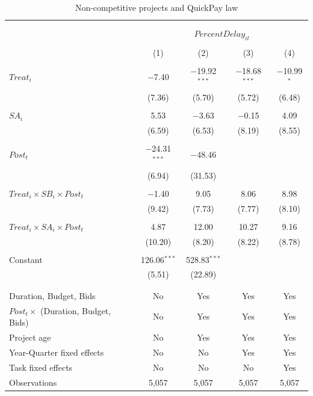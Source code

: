 \documentclass[
]{article}
\begin{document}
\begin{table}[H] \centering 
  \caption{Non-competitive projects and QuickPay law} 
  \label{} 
\small 
\begin{tabular}{@{\extracolsep{-2pt}}lcccc} 
\\[-1.8ex]\hline 
\hline \\[-1.8ex] 
\\[-1.8ex] & \multicolumn{4}{c}{$PercentDelay_{it}$  } \\ 
\\[-1.8ex] & (1) & (2) & (3) & (4)\\ 
\hline \\[-1.8ex] 
 $Treat_i$ & $-$7.40 & $-$19.92$^{***}$ & $-$18.68$^{***}$ & $-$10.99$^{*}$ \\ 
  & (7.36) & (5.70) & (5.72) & (6.48) \\ 
  & & & & \\ 
 $SA_i$ & 5.53 & $-$3.63 & $-$0.15 & 4.09 \\ 
  & (6.59) & (6.53) & (8.19) & (8.55) \\ 
  & & & & \\ 
 $Post_t$ & $-$24.31$^{***}$ & $-$48.46 &  &  \\ 
  & (6.94) & (31.53) &  &  \\ 
  & & & & \\ 
 $Treat_i \times SB_i \times Post_t$ & $-$1.40 & 9.05 & 8.06 & 8.98 \\ 
  & (9.42) & (7.73) & (7.77) & (8.10) \\ 
  & & & & \\ 
 $Treat_i \times SA_i \times Post_t$ & 4.87 & 12.00 & 10.27 & 9.16 \\ 
  & (10.20) & (8.20) & (8.22) & (8.78) \\ 
  & & & & \\ 
 Constant & 126.06$^{***}$ & 528.83$^{***}$ &  &  \\ 
  & (5.51) & (22.89) &  &  \\ 
  & & & & \\ 
\hline \\[-1.8ex] 
Duration, Budget, Bids & No & Yes & Yes & Yes \\ 
$Post_t \times $  (Duration, Budget, Bids) & No & Yes & Yes & Yes \\ 
Project age & No & Yes & Yes & Yes \\ 
Year-Quarter fixed effects & No & No & Yes & Yes \\ 
Task fixed effects & No & No & No & Yes \\ 
Observations & 5,057 & 5,057 & 5,057 & 5,057 \\ 

\end{tabular}
\end{table}
\end{document}

